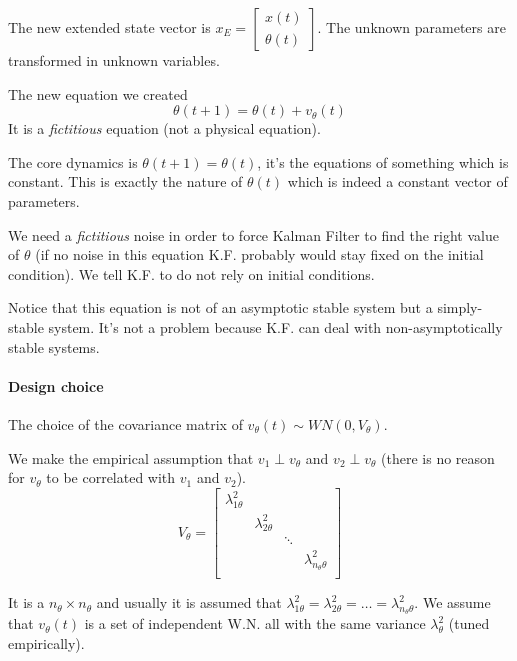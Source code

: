 The new extended state vector is $x_E = \begin{bmatrix} x(t) \\ \theta(t) \end{bmatrix}$.
The unknown parameters are transformed in unknown variables.

The new equation we created
\[
    \theta(t+1) = \theta(t) + v_\theta(t)
\]
It is a \emph{fictitious} equation (not a physical equation).

The core dynamics is $\theta(t+1)=\theta(t)$, it's the equations of something which is constant.
This is exactly the nature of $\theta(t)$ which is indeed a constant vector of parameters.

We need a \emph{fictitious} noise in order to force Kalman Filter to find the right value of $\theta$ (if no noise in this equation K.F. probably would stay fixed on the initial condition).
We tell K.F. to do not rely on initial conditions.

Notice that this equation is not of an asymptotic stable system but a simply-stable system.
It's not a problem because K.F. can deal with non-asymptotically stable systems.

\paragraph{Design choice} The choice of the covariance matrix of $v_\theta(t) \sim WN(0, V_\theta)$.

We make the empirical assumption that $v_1 \perp v_\theta$ and $v_2 \perp v_\theta$ (there is no reason for $v_\theta$ to be correlated with $v_1$ and $v_2$).
\[
    V_\theta = \begin{bmatrix}
        \lambda_{1\theta}^2 & & & \\
        & \lambda_{2\theta}^2 & & \\
        & & \ddots & \\
        & & & \lambda_{n_\theta\theta}^2\\
    \end{bmatrix}
\]

It is a $n_\theta\times n_\theta$ and usually it is assumed that $\lambda_{1\theta}^2=\lambda_{2\theta}^2=\dots=\lambda_{n_\theta\theta}^2$.
We assume that $v_\theta(t)$ is a set of independent W.N. all with the same variance $\lambda_\theta^2$ (tuned empirically).

